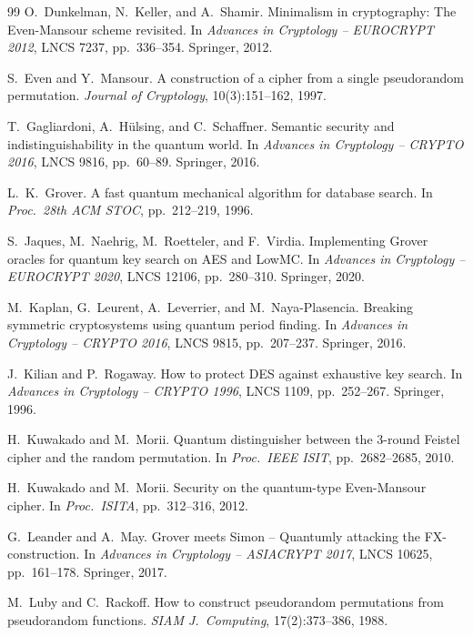 \documentclass[11pt]{article}
\begin{document}
\begin{thebibliography}{99}
O.~Dunkelman, N.~Keller, and A.~Shamir.
\newblock Minimalism in cryptography: The Even-Mansour scheme revisited.
\newblock In \emph{Advances in Cryptology -- EUROCRYPT 2012}, LNCS 7237, pp.~336--354. Springer, 2012.

S.~Even and Y.~Mansour.
\newblock A construction of a cipher from a single pseudorandom permutation.
\newblock \emph{Journal of Cryptology}, 10(3):151--162, 1997.

T.~Gagliardoni, A.~H{\"u}lsing, and C.~Schaffner.
\newblock Semantic security and indistinguishability in the quantum world.
\newblock In \emph{Advances in Cryptology -- CRYPTO 2016}, LNCS 9816, pp.~60--89. Springer, 2016.

L.~K.~Grover.
\newblock A fast quantum mechanical algorithm for database search.
\newblock In \emph{Proc.\ 28th ACM STOC}, pp.~212--219, 1996.

S.~Jaques, M.~Naehrig, M.~Roetteler, and F.~Virdia.
\newblock Implementing Grover oracles for quantum key search on AES and LowMC.
\newblock In \emph{Advances in Cryptology -- EUROCRYPT 2020}, LNCS 12106, pp.~280--310. Springer, 2020.

M.~Kaplan, G.~Leurent, A.~Leverrier, and M.~Naya-Plasencia.
\newblock Breaking symmetric cryptosystems using quantum period finding.
\newblock In \emph{Advances in Cryptology -- CRYPTO 2016}, LNCS 9815, pp.~207--237. Springer, 2016.

J.~Kilian and P.~Rogaway.
\newblock How to protect DES against exhaustive key search.
\newblock In \emph{Advances in Cryptology -- CRYPTO 1996}, LNCS 1109, pp.~252--267. Springer, 1996.

H.~Kuwakado and M.~Morii.
\newblock Quantum distinguisher between the 3-round Feistel cipher and the random permutation.
\newblock In \emph{Proc.\ IEEE ISIT}, pp.~2682--2685, 2010.

H.~Kuwakado and M.~Morii.
\newblock Security on the quantum-type Even-Mansour cipher.
\newblock In \emph{Proc.\ ISITA}, pp.~312--316, 2012.

G.~Leander and A.~May.
\newblock Grover meets Simon -- Quantumly attacking the FX-construction.
\newblock In \emph{Advances in Cryptology -- ASIACRYPT 2017}, LNCS 10625, pp.~161--178. Springer, 2017.

M.~Luby and C.~Rackoff.
\newblock How to construct pseudorandom permutations from pseudorandom functions.
\newblock \emph{SIAM J.\ Computing}, 17(2):373--386, 1988.


\end{thebibliography}
\end{document}
